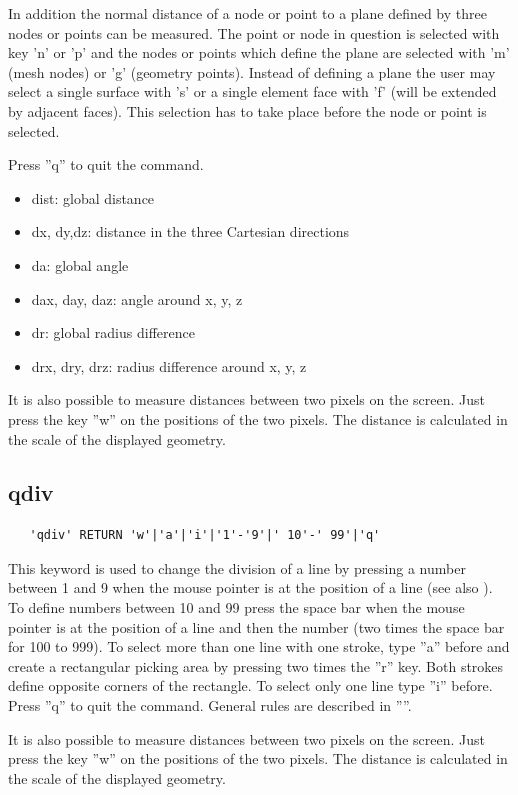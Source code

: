 \documentclass{article}
\begin{document}
In addition the normal distance of a node or point to a plane defined by three nodes or points can be measured. The point or node in question is selected with key 'n' or 'p' and the nodes or points which define the plane are selected with 'm' (mesh nodes) or 'g' (geometry points). Instead of defining a plane the user may select a single surface with 's' or a single element face with 'f' (will be extended by adjacent faces). This selection has to take place before the node or point is selected.

Press ''q'' to quit the command.

\begin{itemize}
\item dist: global distance
\item dx, dy,dz: distance in the three Cartesian directions
\item da: global angle
\item dax, day, daz: angle around x, y, z
\item dr: global radius difference
\item drx, dry, drz: radius difference around x, y, z
\end{itemize}

It is also possible to measure distances between two pixels on the screen. Just press the key ''w'' on the positions of the two pixels. The distance is calculated in the scale of the displayed geometry.

\subsection{\label{qdiv}qdiv}
\begin{verbatim}
   'qdiv' RETURN 'w'|'a'|'i'|'1'-'9'|' 10'-' 99'|'q' 
\end{verbatim}
This keyword is used to change the division of a line by pressing a number between 1 and 9 when the mouse pointer is at the position of a line (see also ). To define numbers between 10 and 99 press the space bar when the mouse pointer is at the position of a line and then the number (two times the space bar for 100 to 999). To select more than one line with one stroke, type ''a'' before and create a rectangular picking area by pressing two times the ''r'' key. Both strokes define opposite corners of the rectangle. To select only one line type ''i'' before. Press ''q'' to quit the command. General rules are described in ''''. 

It is also possible to measure distances between two pixels on the screen. Just press the key ''w'' on the positions of the two pixels. The distance is calculated in the scale of the displayed geometry.
\end{document}
